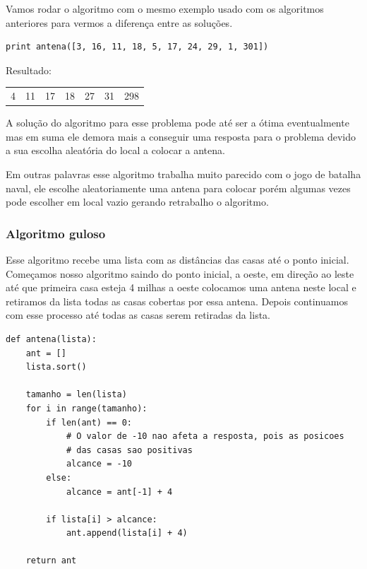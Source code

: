 \documentclass[11pt]{article}
\begin{document}
Vamos rodar o algoritmo com o mesmo exemplo usado com os algoritmos
anteriores para vermos a diferença entre as soluções.


\begin{verbatim}
print antena([3, 16, 11, 18, 5, 17, 24, 29, 1, 301])
\end{verbatim}

Resultado:
\begin{center}
\begin{tabular}{rrrrrrr}
4 & 11 & 17 & 18 & 27 & 31 & 298\\
\end{tabular}
\end{center}

A solução do algoritmo para esse problema pode até ser a ótima
eventualmente mas em suma ele demora mais a conseguir uma resposta
para o problema devido a sua escolha aleatória do local a colocar a
antena.

Em outras palavras esse algoritmo trabalha muito parecido com o jogo
de batalha naval, ele escolhe aleatoriamente uma antena para colocar
porém algumas vezes pode escolher em local vazio gerando retrabalho o
algoritmo.

\subsubsection{Algoritmo guloso}
\label{sec-5-3-3}
\label{sec-3-3}

Esse algoritmo recebe uma lista com as distâncias das casas até o
ponto inicial. Começamos nosso algoritmo saindo do ponto inicial,
a oeste, em direção ao leste até que primeira casa esteja 4 milhas a
oeste colocamos uma antena neste local e retiramos da lista todas as
casas cobertas por essa antena. Depois continuamos com esse processo
até todas as casas serem retiradas da lista.

\begin{verbatim}
def antena(lista):
    ant = []
    lista.sort()

    tamanho = len(lista)
    for i in range(tamanho):
        if len(ant) == 0:
            # O valor de -10 nao afeta a resposta, pois as posicoes
            # das casas sao positivas
            alcance = -10
        else:
            alcance = ant[-1] + 4

        if lista[i] > alcance:
            ant.append(lista[i] + 4)

    return ant
\end{verbatim}
\end{document}
